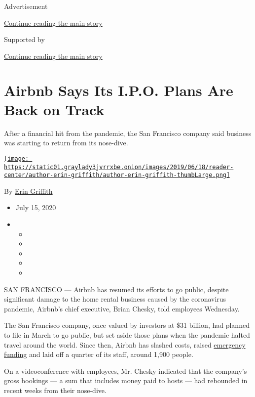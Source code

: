 Advertisement

\protect\hyperlink{after-top}{Continue reading the main story}

Supported by

\protect\hyperlink{after-sponsor}{Continue reading the main story}

\hypertarget{airbnb-says-its-ipo-plans-are-back-on-track}{%
\section{Airbnb Says Its I.P.O. Plans Are Back on
Track}\label{airbnb-says-its-ipo-plans-are-back-on-track}}

After a financial hit from the pandemic, the San Francisco company said
business was starting to return from its nose-dive.

\href{https://www.nytimes3xbfgragh.onion/by/erin-griffith}{\texttt{[image: https://static01.graylady3jvrrxbe.onion/images/2019/06/18/reader-center/author-erin-griffith/author-erin-griffith-thumbLarge.png]}}

By \href{https://www.nytimes3xbfgragh.onion/by/erin-griffith}{Erin
Griffith}

\begin{itemize}
\item
  July 15, 2020
\item
  \begin{itemize}
  \item
  \item
  \item
  \item
  \item
  \end{itemize}
\end{itemize}

SAN FRANCISCO --- Airbnb has resumed its efforts to go public, despite
significant damage to the home rental business caused by the coronavirus
pandemic, Airbnb's chief executive, Brian Chesky, told employees
Wednesday.

The San Francisco company, once valued by investors at \$31 billion, had
planned to file in March to go public, but set aside those plans when
the pandemic halted travel around the world. Since then, Airbnb has
slashed costs, raised
\href{https://www.nytimes3xbfgragh.onion/2020/04/06/technology/airbnb-coronavirus-valuation.html}{emergency
funding} and laid off a quarter of its staff, around 1,900 people.

On a videoconference with employees, Mr. Chesky indicated that the
company's gross bookings --- a sum that includes money paid to hosts ---
had rebounded in recent weeks from their nose-dive.

